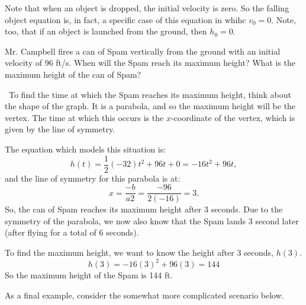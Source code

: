 Note that when an object is dropped, the initial velocity is zero. So the falling object equation is, in fact, a specific case of this equation in whihc $v_0=0$. Note, too, that if an object is launched from the ground, then $h_0=0$.

\begin{boxex}
Mr. Campbell fires a can of Spam vertically from the ground with an initial velocity of 96 ft/s. When will the Spam reach its maximum height? What is the maximum height of the can of Spam?

\exsoln\ To find the time at which the Spam reaches its maximum height, think about the shape of the graph. It is a parabola, and so the maximum height will be the vertex. The time at which this occurs is the $x$-coordinate of the vertex, which is given by the line of symmetry.

The equation which models this situation is:
\[h(t) = \frac{1}{2}(-32)t^2 + 96t + 0 = -16t^2+96t,\]
and the line of symmetry for this parabola is at:
\[x=\frac{-b}{a2} = \frac{-96}{2(-16)} = 3.\]
So, the can of Spam reaches its maximum height after 3 seconds. Due to the symmetry of the parabola, we now also know that the Spam lands 3 second later (after flying for a total of 6 seconds).

To find the maximum height, we want to know the height after 3 seconds, $h(3)$.
\[h(3) = -16(3)^2 + 96(3) = 144\]
So the maximum height of the Spam is 144 ft.
\end{boxex}

As a final example, consider the somewhat more complicated scenario below.

